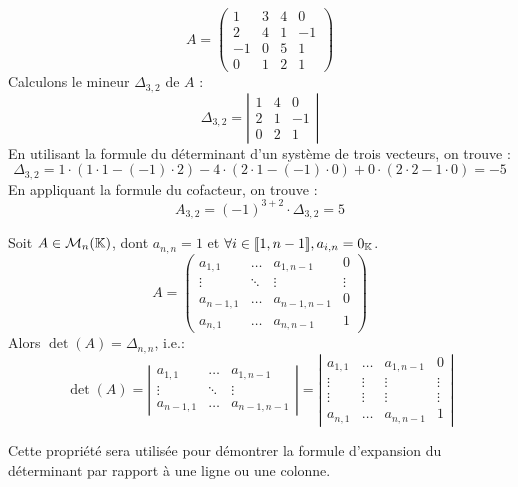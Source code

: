 \documentclass[12pt, a4paper]{report}
\begin{document}
\begin{example}
    $$A = \left(\begin{matrix} 1 & 3 & 4 & 0 \\ 2 & 4 & 1 & -1 \\ -1 & 0 & 5 & 1 \\ 0 & 1 & 2 & 1 \end{matrix}\right)$$
    Calculons le mineur $\Delta_{3,2}$ de $A$ :
    $$\Delta_{3,2} = \left|\begin{matrix} 1 & 4 & 0 \\ 2 & 1 & -1 \\ 0 & 2 & 1 \end{matrix}\right|$$
    En utilisant la formule du déterminant d'un système de trois vecteurs, on trouve :
    $$\Delta_{3,2} = 1 \cdot (1 \cdot 1 - (-1) \cdot 2) - 4 \cdot (2 \cdot 1 - (-1) \cdot 0) + 0 \cdot (2 \cdot 2 - 1 \cdot 0) = -5$$
    En appliquant la formule du cofacteur, on trouve :
    $$A_{3,2} = (-1)^{3+2} \cdot \Delta_{3,2} = 5$$
\end{example}

\begin{property}
    Soit $A \in \mathcal M_n(\mathbb{K})$, dont $a_{n,n} = 1$ et $\forall i \in [\![1,n-1]\!], a_{i,n} = 0_{\mathbb{K}}$.
    $$A = \left(\begin{matrix} a_{1,1} & \dots & a_{1,n-1} & 0 \\ \vdots & \ddots & \vdots & \vdots \\ a_{n-1,1} & \dots & a_{n-1,n-1} & 0 \\ a_{n,1} & \dots & a_{n,n-1} & 1 \end{matrix}\right)$$
    Alors $\det(A) = \Delta_{n,n}$, i.e.:
    $$\det(A) = \left|\begin{matrix} a_{1,1} & \dots & a_{1,n-1} \\ \vdots & \ddots & \vdots \\ a_{n-1,1} & \dots & a_{n-1,n-1} \end{matrix}\right| = \left|\begin{matrix} a_{1,1} & \dots & a_{1,n-1} & 0 \\ \vdots & \vdots & \vdots & \vdots \\ \vdots & \vdots & \vdots & \vdots \\ a_{n,1} & \dots & a_{n,n-1} & 1 \end{matrix}\right|$$
\end{property}

Cette propriété sera utilisée pour démontrer la formule d'expansion du déterminant par rapport à une ligne ou une colonne.
\end{document}
